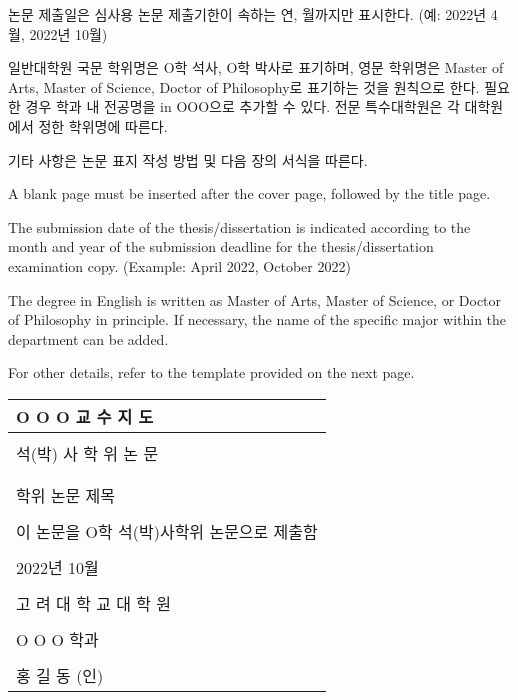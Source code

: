 \documentclass[11pt]{report}
\numberwithin{figure}{chapter}
\theoremstyle{plain}
\theoremstyle{definition}
\theoremstyle{corollary}
\theoremstyle{definition}
\theoremstyle{plain}
\theoremstyle{definition}
\theoremstyle{plain}
\begin{document}
논문 제출일은 심사용 논문 제출기한이 속하는 연, 월까지만 표시한다. (예: 2022년 4월, 2022년 10월)

일반대학원 국문 학위명은 O학 석사, O학 박사로 표기하며, 영문 학위명은 Master of Arts, Master of Science, Doctor of Philosophy로 표기하는 것을 원칙으로 한다.
필요한 경우 학과 내 전공명을 in OOO으로 추가할 수 있다.
전문 특수대학원은 각 대학원에서 정한 학위명에 따른다.

기타 사항은 논문 표지 작성 방법 및 다음 장의 서식을 따른다.

\bigskip

A blank page must be inserted after the cover page, followed by the title page.

The submission date of the thesis/dissertation is indicated according to the month and year of the submission deadline for the thesis/dissertation examination copy.
(Example: April 2022, October 2022)

The degree in English is written as Master of Arts, Master of Science, or Doctor of Philosophy in principle.
If necessary, the name of the specific major within the department can be added.

For other details, refer to the template provided on the next page.

\newpage
\noindent
\begin{tabularx}{\textwidth}{| >{\centering\arraybackslash}X |}
\arrayrulecolor{blue}
\hline
\Large O O O 교 수 지 도 \\\hline
\\[-8pt]\hline
\Large 석(박) 사 학 위 논 문 \\\hline
\rule{0pt}{60pt}\\\hline
\\[-15pt]
\huge 학위 논문 제목\\
\rule{0pt}{60pt}\\\hline
\Large 이 논문을 O학 석(박)사학위 논문으로 제출함 \\\hline
\rule{0pt}{50pt}\\\hline
\large 2022년 10월 \\\hline
\rule{0pt}{50pt}\\\hline
\LARGE 고 려 대 학 교  대 학 원 \\\hline
\\[-8pt]\hline
\Large O O O 학과\\\hline
\\[10pt]\hline
\Large 홍 길 동 (인)\\\hline
\end{tabularx}
\end{document}
